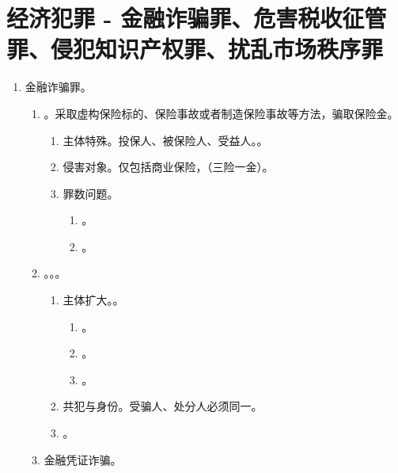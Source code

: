\section{经济犯罪 - 金融诈骗罪、危害税收征管罪、侵犯知识产权罪、扰乱市场秩序罪}
\begin{enumerate}
  \item 金融诈骗罪。
        \begin{enumerate}
          \item {}。采取虚构保险标的、保险事故或者制造保险事故等方法，骗取保险金。
                \begin{enumerate}
                  \item 主体特殊。投保人、被保险人、受益人。。
                  \item 侵害对象。仅包括商业保险，（三险一金）。
                  \item 罪数问题。
                        \begin{enumerate}
                          \item {}。
                          \item {}。
                        \end{enumerate}
                \end{enumerate}
          \item {}。。。
                \begin{enumerate}
                  \item 主体扩大。。
                        \begin{enumerate}
                          \item {}。
                          \item {}。
                          \item {}。
                        \end{enumerate}
                  \item 共犯与身份。受骗人、处分人必须同一。
                  \item {}。
                \end{enumerate}
          \item 金融凭证诈骗。

\end{enumerate}
\end{enumerate}

